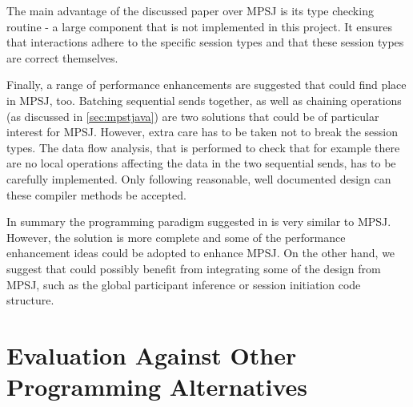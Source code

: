 The main advantage of the discussed paper over MPSJ is its type checking routine - a large component that is not implemented in this project. It ensures that interactions adhere to the specific session types and that these session types are correct themselves.

Finally, a range of performance enhancements are suggested that could find place in MPSJ, too. Batching sequential sends together, as well as chaining operations (as discussed in \autoref{sec:mpstjava}) are two solutions that could be of particular interest for MPSJ. However, extra care has to be taken not to break the session types. The data flow analysis, that is performed to check that for example there are no local operations affecting the data in the two sequential sends, has to be carefully implemented. Only following reasonable, well documented design can these compiler methods be accepted.

In summary the programming paradigm suggested in \cite{sess_type_guided_distr_interact} is very similar to MPSJ. However, the solution is more complete and some of the performance enhancement ideas could be adopted to enhance MPSJ. On the other hand, we suggest that \cite{sess_type_guided_distr_interact} could possibly benefit from integrating some of the design from MPSJ, such as the global participant inference or session initiation code structure. 

\section{Evaluation Against Other Programming Alternatives}